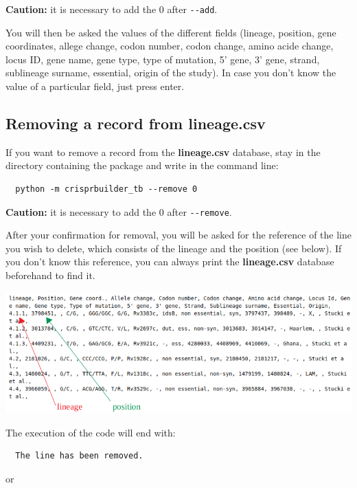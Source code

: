 \documentclass[twoside,a4paper,11pt,frenchb,openany]{report}
\begin{document}
    \textbf{Caution:} it is necessary to add the 0 after \texttt{-\/-add}.

You will then be asked the values of the different fields (lineage,
position, gene coordinates, allege change, codon number, codon change,
amino acide change, locus ID, gene name, gene type, type of mutation, 5'
gene, 3' gene, strand, sublineage surname, essential, origin of the
study). In case you don't know the value of a particular field, just
press enter.



    \subsection{Removing a record from
lineage.csv}\label{removing-a-record-from-lineage.csv}

    If you want to remove a record from the \textbf{lineage.csv} database,
stay in the directory containing the package and write in the command
line:

    \begin{verbatim}
  python -m crisprbuilder_tb --remove 0
\end{verbatim}

    \textbf{Caution:} it is necessary to add the 0 after
\texttt{-\/-remove}.

After your confirmation for removal, you will be asked for the reference
of the line you wish to delete, which consists of the lineage and the
position (see below). If you don't know this reference, you can always
print the \textbf{lineage.csv} database beforehand to find it.

\includegraphics[width=16cm]{selection.png}

    The execution of the code will end with:

    \begin{verbatim}
  The line has been removed.
\end{verbatim}

    or
\end{document}

